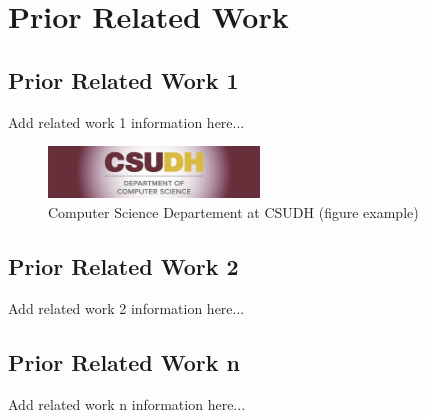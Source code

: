 \newpage
\section{Prior Related Work}
\subsection{Prior Related Work 1}
Add related work 1 information here...

\begin{figure}[H]
    \centering
    \includegraphics[width=0.5\textwidth]{figures/cs_csudh.png}
    \caption{Computer Science Departement at CSUDH (figure example)}
    \label{fig:CS_CSUDH_LOGO}
\end{figure}

\subsection{Prior Related Work 2}
Add related work 2 information here...

\subsection{Prior Related Work n}
Add related work n information here...